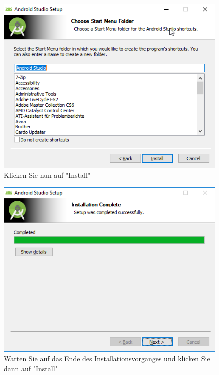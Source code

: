 \documentclass[a4paper,10pt,xetex]{article}
\begin{document}
\begin{figure}
  \centering
  \includegraphics[width=\textwidth]{Installation/1-5}
  \caption{Klicken Sie nun auf "Install" }
\end{figure}

\begin{figure}
  \centering
  \includegraphics[width=\textwidth]{Installation/1-7}
  \caption{Warten Sie auf das Ende des Installationsvorganges und klicken Sie dann auf "Install" }
\end{figure}
\end{document}

